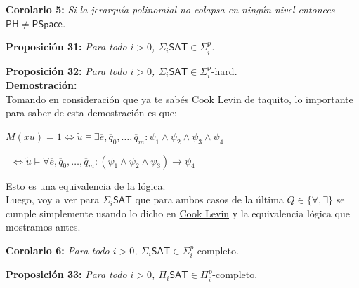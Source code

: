 \documentclass{article}
\begin{document}
\begin{flushleft}
  \textbf{Corolario 5:}
  \textit{Si la jerarquía polinomial no colapsa en ningún nivel entonces $\mathsf{PH} \neq \mathsf{PSpace}$.}
\end{flushleft}

\begin{flushleft}
  \textbf{Proposición 31:}
  \textit{Para todo $i > 0$, $\Sigma_i \mathsf{SAT} \in \Sigma^p_i$.}
\end{flushleft}

\begin{flushleft}
  \textbf{Proposición 32:}
  \textit{Para todo $i > 0$, $\Sigma_i \mathsf{SAT} \in \Sigma^p_i$}-hard. \\[0.5em]

  \textbf{\textcolor{Mulberry}{Demostración:}} \\[0.5em]
  
  Tomando en consideración que ya te sabés \hyperlink{cooklevin}{\textcolor{Rhodamine}{Cook Levin}} de taquito, lo importante 
  para saber de esta demostración es que:
\end{flushleft}
\begin{center}
  $M(xu) = 1 \iff \tilde{u} \models \exists \overline{e}, \overline{q}_0, \dots, \overline{q}_m : \psi_1 \land \psi_2 
  \land \psi_3 \land \psi_4$

  \qquad \qquad \qquad \ $\iff \tilde{u} \models \forall \overline{e}, \overline{q}_0, \dots, \overline{q}_m : (\psi_1 
  \land \psi_2 \land \psi_3) \rightarrow \psi_4$
\end{center}
\begin{flushleft}
  Esto es una equivalencia de la lógica. \\[0.5em]

  Luego, voy a ver para $\Sigma_i\mathsf{SAT}$ que para ambos casos de la última $Q \in \{\forall, \exists\}$ se cumple 
  simplemente usando lo dicho en \hyperlink{cooklevin}{\textcolor{Rhodamine}{Cook Levin}} y la equivalencia lógica que 
  mostramos antes.
\end{flushleft}


\begin{flushleft}
  \textbf{Corolario 6:}
  \textit{Para todo $i > 0$, $\Sigma_i \mathsf{SAT} \in \Sigma^p_i$}-completo.
\end{flushleft}

\begin{flushleft}
  \textbf{Proposición 33:}
  \textit{Para todo $i > 0$, $\Pi_i \mathsf{SAT} \in \Pi^p_i$}-completo.
\end{flushleft}
\end{document}
